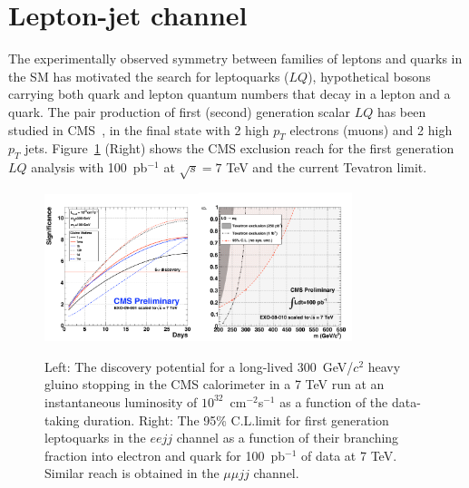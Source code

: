 \documentclass{cmspaper}
\begin{document}
\section{Lepton-jet channel} \label{leptonjet}
The experimentally observed symmetry between families of  
leptons and quarks in the SM has motivated the search for leptoquarks ($LQ$), 
hypothetical bosons carrying both quark and lepton quantum numbers 
that decay in a lepton and a quark.
The pair production of first (second) generation scalar $LQ$ has been studied in CMS~\cite{LQPAS}, 
in the final state with 2 high $p_T$ electrons (muons) and 2 high $p_T$ jets. 
Figure~\ref{fig:StoppedHadron_LQ} (Right) shows the CMS exclusion reach for the first generation $LQ$ analysis 
with 100~pb$^{-1}$ at $\sqrt{s} = 7$ TeV and the current Tevatron limit.

\begin{figure}[htbp] 
\centering
\includegraphics[width=0.4\textwidth]{SG1.pdf}\includegraphics[width=0.4\textwidth]{LQ1_95.pdf}  
\caption{Left: The discovery potential for a long-lived 300~GeV/$c^2$ heavy gluino stopping in the CMS calorimeter 
in a 7 TeV run at an instantaneous luminosity of $10^{32}$~cm$^{-2}$s$^{-1}$ as a function of the data-taking 
duration. Right: The 95\% C.L.limit for first generation leptoquarks in the $ee jj$ channel as 
a function of their branching fraction into electron and quark for 100~pb$^{-1}$ of data at 7 TeV.
Similar reach is obtained in the $\mu\mu jj$ channel.}
\label{fig:StoppedHadron_LQ}
\end{figure}
\end{document}

